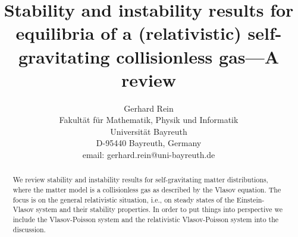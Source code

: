 \documentclass[11pt]{article}
\begin{document}
\def\R{\mathbb R}
\def\N{\mathbb N}

\def\pp{\left\langle p\right\rangle}
\def\pv{\left\langle v\right\rangle}

\def\supp{\mathrm{supp}\,}
\def\div{\mathrm{div}\,}

\def\ekin{E_\mathrm{kin}}
\def\epot{E_\mathrm{pot}}
\def\A{{\cal A}}
\def\B{{\cal B}}
\def\Cc{{\cal C}}
\def\H{{\cal H}}
\def\Hc{{\cal H}_C}
\def\Hr{{{\cal H}_r}}
\def\F{{\cal F}}
\def\K{{\cal K}}
\def\L{{\cal L}}
\def\M{{\cal M}}
\def\Ro{{{\cal R}}}
\def\T{{\cal T}}

\def\Ds{{\mathscr D}}
\def\Rs{{\mathscr R}}
\def\Ns{{\mathscr N}}


\sloppy
\newtheorem{maintheorem}{Theorem}
\newtheorem{theorem}{Theorem}[section]
\newtheorem{definition}[theorem]{Definition}
\newtheorem{proposition}[theorem]{Proposition}
\newtheorem{example}[theorem]{Example}
\newtheorem{corollary}[theorem]{Corollary}
\newtheorem{lemma}[theorem]{Lemma}
\theoremstyle{remark}
\newtheorem*{remark}{Remark}

\renewcommand{\theequation}{\arabic{section}.\arabic{equation}}

\title{Stability and instability results for equilibria
  of a (relativistic) self-gravitating collisionless gas---A review}
\author{Gerhard Rein\\
        Fakult\"at f\"ur Mathematik, Physik und Informatik\\
        Universit\"at Bayreuth\\
        D-95440 Bayreuth, Germany\\
        email: gerhard.rein@uni-bayreuth.de}

\maketitle

\begin{abstract}
  We review stability and instability results for self-gravitating
  matter distributions, where the matter model is a collisionless gas
  as described by the Vlasov equation. The focus is on the general
  relativistic situation, i.e., on steady states of the Einstein-Vlasov
  system and their stability properties. In order to put things into
  perspective we include the Vlasov-Poisson system and the relativistic
  Vlasov-Poisson system into the discussion.
\end{abstract}


\tableofcontents
%
%
\end{document}
